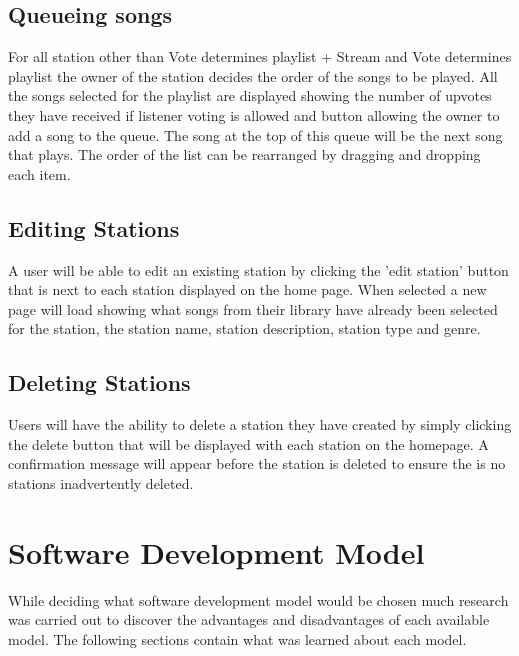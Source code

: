 \documentclass[a4paper, 12pt]{report}
\begin{document}
\subsection{Queueing songs}
For all station other than Vote determines playlist + Stream and Vote determines playlist the owner of the station decides the order of the songs to be played. All the songs selected for the playlist are displayed showing the number of upvotes they have received if listener voting is allowed and button allowing the owner to add a song to the queue. The song at the top of this queue will be the next song that plays. The order of the list can be rearranged by dragging and dropping each item. 

\subsection{Editing Stations}
A user will be able to edit an existing station by clicking the 'edit station' button that is next to each station displayed on the home page. When selected a new page will load showing what songs from their library have already been selected for the station, the station name, station description, station type and genre. 

\subsection{Deleting Stations}
Users will have the ability to delete a station they have created by simply clicking the delete button that will be displayed with each station on the homepage. A confirmation message will appear before the station is deleted to ensure the is no stations inadvertently deleted.

\section{Software Development Model}
While deciding what software development model would be chosen much research was carried out to discover the advantages and disadvantages of each available model. The following sections contain what was learned about each model.
\end{document}
